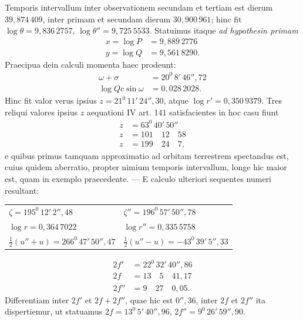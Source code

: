 Temporis intervallum inter observationem secundam et tertiam est dierum $39{,}874\,409$, inter primam et secundam dierum $30{,}900\,961$; hinc fit $\log\theta=9{,}836\,2757$, $\log\theta''=9{,}725\,5533$. Statuimus itaque \textit{ad hypothesin primam}
\[
\begin{aligned}
x=\log P&=9{,}889\,2776\\
y=\log Q&=9{,}561\,8290.
\end{aligned}
\]
\noindent Praecipua dein calculi momenta haec prodeunt:
\[
\begin{aligned}
\omega+\sigma&=20^0\,8'\,46''{,}72\\
\log Qc\sin\omega&=0{,}028\,2028.
\end{aligned}
\]
\noindent Hinc fit valor verus ipsius $z=21^0\,11'\,24''{,}30$, atque $\log r'=0{,}350\,9379$. Tres reliqui valores ipsius $z$ aequationi IV art. 141 satisfacientes in hoc casu fiunt
\[
\begin{aligned}
z&=63^0\,40'\,50''\\
z&=101\quad12\quad58\\
z&=199\quad24\quad7,
\end{aligned}
\]
\noindent{}e quibus primus tamquam approximatio ad orbitam terrestrem spectandus est, cuius quidem aberratio, propter nimium temporis intervallum, longe hic maior est, quam in exemplo praecedente. --- E calculo ulteriori sequentes numeri resultant:
\begin{center}\begingroup\footnotesize\setlength{\tabcolsep}{6pt}\renewcommand{\arraystretch}{1.3}
\begin{tabular}{ll}
$\zeta=195^0\,12'\,2''{,}48$ & $\zeta''=196^0\,57'\,50''{,}78$\\
$\log r=0{,}364\,7022$ & $\log r''=0{,}335\,5758$\\
$\tfrac12(u''+u)=266^0\,47'\,50''{,}47$ & $\tfrac12(u''-u)=-43^0\,39'\,5''{,}33$
\end{tabular}\endgroup\end{center}
\[
\begin{aligned}
2f'&=22^0\,32'\,40''{,}86\\
2f&=13\quad5\quad41{,}17\\
2f''&=9\quad27\quad0{,}05.
\end{aligned}
\]
\noindent Differentiam inter $2f'$ et $2f+2f''$, quae hic est $0''{,}36$, inter $2f$ et $2f''$ ita dispertiemur, ut statuamus $2f=13^0\,5'\,40''{,}96$, $2f''=9^0\,26'\,59''{,}90$.

